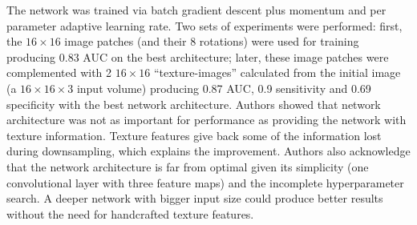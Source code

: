 The network was trained via batch gradient descent plus momentum and per parameter adaptive learning rate. Two sets of experiments were performed: first, the $16 \times 16$ image patches (and their 8 rotations) were used for training producing 0.83 AUC on the best architecture; later, these image patches were complemented with 2 $16 \times 16$ ``texture-images'' calculated from the initial image (a $16\times 16 \times 3$ input volume) producing 0.87 AUC, 0.9 sensitivity and 0.69 specificity with the best network architecture.
Authors showed that network architecture was not as important for performance as providing the network with texture information.
Texture features give back some of the information lost during downsampling, which explains the improvement. Authors also acknowledge that the network architecture is far from optimal given its simplicity (one convolutional layer with three feature maps) and the incomplete hyperparameter search. A deeper network with bigger input size could produce better results without the need for handcrafted texture features.




